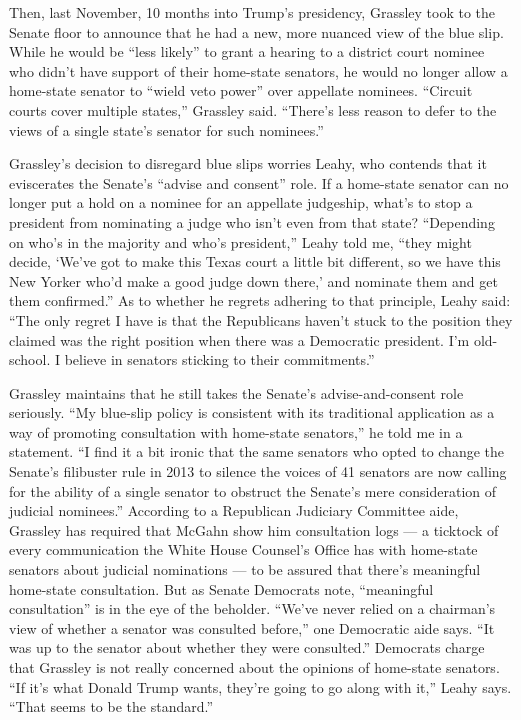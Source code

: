 Then, last November, 10 months into Trump's presidency, Grassley took to
the Senate floor to announce that he had a new, more nuanced view of the
blue slip. While he would be ``less likely'' to grant a hearing to a
district court nominee who didn't have support of their home-state
senators, he would no longer allow a home-state senator to ``wield veto
power'' over appellate nominees. ``Circuit courts cover multiple
states,'' Grassley said. ``There's less reason to defer to the views of
a single state's senator for such nominees.''

Grassley's decision to disregard blue slips worries Leahy, who contends
that it eviscerates the Senate's ``advise and consent'' role. If a
home-state senator can no longer put a hold on a nominee for an
appellate judgeship, what's to stop a president from nominating a judge
who isn't even from that state? ``Depending on who's in the majority and
who's president,'' Leahy told me, ``they might decide, `We've got to
make this Texas court a little bit different, so we have this New Yorker
who'd make a good judge down there,' and nominate them and get them
confirmed.'' As to whether he regrets adhering to that principle, Leahy
said: ``The only regret I have is that the Republicans haven't stuck to
the position they claimed was the right position when there was a
Democratic president. I'm old-school. I believe in senators sticking to
their commitments.''

Grassley maintains that he still takes the Senate's advise-and-consent
role seriously. ``My blue-slip policy is consistent with its traditional
application as a way of promoting consultation with home-state
senators,'' he told me in a statement. ``I find it a bit ironic that the
same senators who opted to change the Senate's filibuster rule in 2013
to silence the voices of 41 senators are now calling for the ability of
a single senator to obstruct the Senate's mere consideration of judicial
nominees.'' According to a Republican Judiciary Committee aide, Grassley
has required that McGahn show him consultation logs --- a ticktock of
every communication the White House Counsel's Office has with home-state
senators about judicial nominations --- to be assured that there's
meaningful home-state consultation. But as Senate Democrats note,
``meaningful consultation'' is in the eye of the beholder. ``We've never
relied on a chairman's view of whether a senator was consulted before,''
one Democratic aide says. ``It was up to the senator about whether they
were consulted.'' Democrats charge that Grassley is not really concerned
about the opinions of home-state senators. ``If it's what Donald Trump
wants, they're going to go along with it,'' Leahy says. ``That seems to
be the standard.''

